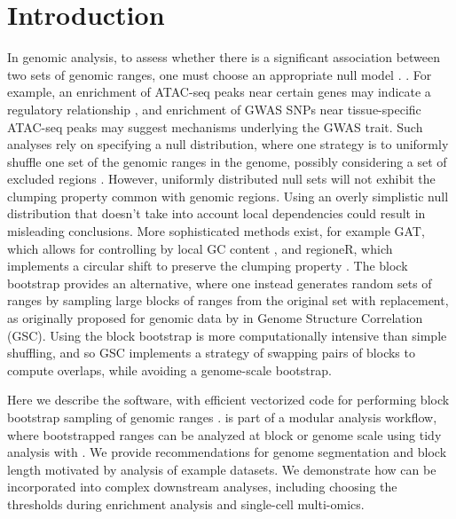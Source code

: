 \section{Introduction}

In genomic analysis, to assess whether
there is a significant association between two sets of genomic ranges, 
one must choose an appropriate null model \citep{reviewdilemma2014,kanduri2018}.
.
For example, an enrichment of ATAC-seq peaks near certain genes
may indicate a regulatory relationship \citep{lee2020fluent}, 
and enrichment of GWAS SNPs near tissue-specific ATAC-seq peaks may
suggest mechanisms underlying the GWAS trait.
Such analyses rely on specifying a null distribution, where one
strategy is to uniformly shuffle one set of the
genomic ranges in the genome, possibly considering a set of
excluded regions  \citep{excluderanges}.
However, uniformly distributed null sets will not exhibit the
clumping property common with genomic regions.
Using an overly simplistic null distribution that doesn't take into
account local dependencies could result in misleading conclusions.
More sophisticated methods exist, for example
GAT, which allows for controlling by local GC content
\citep{GAT_2013}, and regioneR, which implements a circular shift to
preserve the clumping property \citep{gel2016regioner}.
The block bootstrap \citep{politis1999subsampling}
provides an alternative, where one instead generates
random sets of ranges by sampling large blocks of ranges from the
original set with replacement, as originally proposed for 
genomic data by \citet{bickel2010subsampling} in Genome Structure
Correlation (GSC).
Using the block bootstrap is more
computationally intensive than simple shuffling, and so GSC implements
a strategy of swapping pairs of blocks to compute overlaps, while
avoiding a genome-scale bootstrap.

Here we describe the \bootranges software, with efficient
vectorized code for performing block bootstrap sampling of genomic ranges
\citep{lawrence2013software}.
\bootranges is part of a modular analysis workflow, where bootstrapped
ranges can be analyzed at block or genome scale using tidy
analysis with \plyranges \citep{lee2019plyranges} .
We provide recommendations for genome segmentation and block length
motivated by analysis of example datasets.
We demonstrate how \bootranges can be incorporated into complex
downstream analyses, including choosing the thresholds during
enrichment analysis and single-cell multi-omics.

